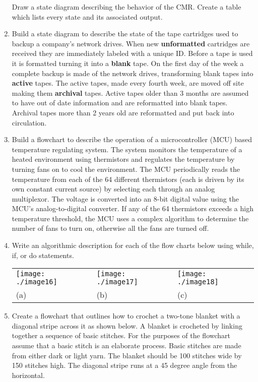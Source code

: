 \begin{enumerate}
  Draw a state diagram describing the behavior of the CMR. Create a
  table which lists every state and its associated output.

  \item
    Build a state diagram to describe the state of the tape cartridges
    used to backup a company's network drives. When new
    \textbf{unformatted} cartridges are received they are immediately
    labeled with a unique ID. Before a tape is used it is formatted
    turning it into a \textbf{blank} tape. On the first day of the week
    a complete backup is made of the network drives, transforming blank
    tapes into \textbf{active} tapes. The active tapes, made every
    fourth week, are moved off site making them \textbf{archival} tapes.
    Active tapes older than 3 months are assumed to have out of date
    information and are reformatted into blank tapes. Archival tapes
    more than 2 years old are reformatted and put back into circulation.
  \item
    Build a flowchart to describe the operation of a microcontroller
    (MCU) based temperature regulating system. The system monitors the
    temperature of a heated environment using thermistors and regulates
    the temperature by turning fans on to cool the environment. The MCU
    periodically reads the temperature from each of the 64 different
    thermistors (each is driven by its own constant current source) by
    selecting each through an analog multiplexor. The voltage is
    converted into an 8-bit digital value using the MCU's
    analog-to-digital converter. If any of the 64 thermistors exceeds a
    high temperature threshold, the MCU uses a complex algorithm to
    determine the number of fans to turn on, otherwise all the fans are
    turned off.
  \item
    Write an algorithmic description for each of the flow charts below
    using while, if, or do statements.

\begin{tabular}{m{4cm}m{4cm}m{4cm}}
\texttt{[image: ./image16]} &
\texttt{[image: ./image17]} &
\texttt{[image: ./image18]} \\
(a) &  (b)  & (c) \\
\end{tabular}

\item
  Create a flowchart that outlines how to crochet a two-tone blanket
  with a diagonal stripe across it as shown below. A blanket is
  crocheted by linking together a sequence of basic stitches. For the
  purposes of the flowchart assume that a basic stitch is an elaborate
  process. Basic stitches are made from either dark or light yarn. The
  blanket should be 100 stitches wide by 150 stitches high. The diagonal
  stripe runs at a 45 degree angle from the horizontal.


\end{enumerate}
